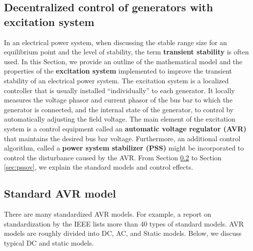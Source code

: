 \documentclass[graybox, envcountchap]{svmult}
\begin{document}
\subsection{Decentralized control of generators with excitation system}

In an electrical power system, when discussing the stable range size for an equilibrium point and the level of stability, the term \textbf{transient stability} is often used.
In this Section, we provide an outline of the mathematical model and the properties of the \textbf{excitation system} implemented to improve the transient stability of an electrical power system.
The excitation system is a localized controller that is usually installed “individually” to each generator.
It locally measures the voltage phasor and current phasor of the bus bar to which the generator is connected, and the internal state of the generator, to control by automatically adjusting the field voltage. The main element of the excitation system is a control equipment called an \textbf{automatic voltage regulator (AVR)} that maintains the desired bus bar voltage. Furthermore, an additional control algorithm, called a \textbf{power system stabilizer (PSS)} might be incorporated to control the disturbance caused by the AVR.
From Section \ref{sec:avrov} to Section \ref{sec:pssov}, we explain the standard models and control effects.

%
%
%




\subsection{Standard AVR model}\label{sec:avrov}

There are many standardized AVR models.
For example, a report on standardization by the IEEE \cite{ieee2016ieee} lists more than 40 types of standard models.
AVR models are roughly divided into DC, AC, and Static models.
Below, we discuss typical DC and static models.
\end{document}
